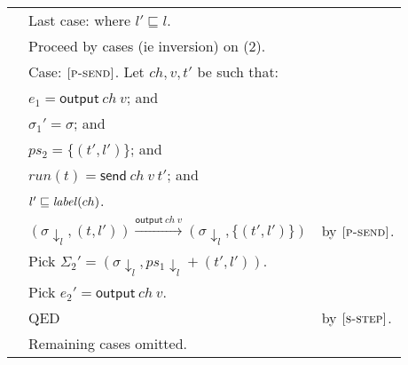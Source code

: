 \documentclass{article}
\newcommand{\rn}[1]{\text{\textsc{[#1]}}}
\newcommand{\tsteparrow}[1]{\overset{#1}{\longrightarrow}}
\newcommand{\tstep}[3]{#2\tsteparrow{#1}#3}
\newcommand{\s}[1]{\text{\textit{#1}}}
\newcommand{\process}[2]{(#1,#2)}
\newcommand{\opsend}[3]{\textsf{send}~#1~#2~#3}
\newcommand{\evsend}[2]{\textsf{output}~#1~#2}
\newcommand{\proj}[2]{#1{\downarrow_{#2}}}
\begin{document}
\begin{tabular}{l@{$\qquad$}l@{$\qquad$}l}
        & Last case: where $l'\sqsubseteq l$.
\\
        & Proceed by cases (ie inversion) on (2).
\\
        & Case: $\rn{p-send}$. Let $ch,v,t'$ be such that:
\\
        & \z $e_1=\evsend{ch}{v}$; and
\\
        & \z $\sigma_1'=\sigma$; and
\\
        & \z $ps_2=\{\process{t'}{l'}\}$; and
\\
        & \z $run(t)=\opsend{ch}{v}{t'}$; and
\\
        & \z $l'\sqsubseteq\s{label}(ch)$.
\\
        & \z $\tstep{\evsend{ch}{v}}{(\proj{\sigma}{l},\process{t}{l'})}{(\proj{\sigma}{l},\{\process{t'}{l'}\})}$
        & by $\rn{p-send}$.
\\
        & \z Pick $\Sigma_2' = {(\proj{\sigma}{l},\proj{ps_1}{l}+\process{t'}{l'})}$.
\\
        & \z Pick $e_2' = {\evsend{ch}{v}}$.
\\
        & \z QED
        & by $\rn{s-step}$.
\\
        & Remaining cases omitted.
\end{tabular}
\end{document}
